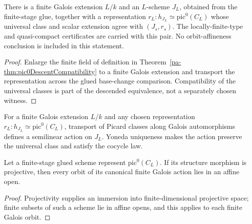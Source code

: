 \begin{theorem}
  \label{pa-thm:pic0FiniteGaloisStage}
  \notready
  There is a finite Galois extension \(L/k\) and an \(L\)-scheme \(J_L\), obtained from the
  finite-stage glue, together with a representation
  \(r_L:h_{J_L}\simeq\mathrm{pic}^0(C_L)\) whose universal class and scalar extension agree
  with \((J_s,r_s)\).  The locally-finite-type and quasi-compact certificates are carried with
  this pair.  No orbit-affineness conclusion is included in this statement.
\end{theorem}
\begin{proof}
  Enlarge the finite field of definition in
  Theorem~\ref{pa-thm:pic0DescentCompatibility} to a finite Galois extension and transport the
  representation across the glued base-change comparison.  Compatibility of the universal
  classes is part of the descended equivalence, not a separately chosen witness.
\end{proof}

\begin{definition}
  \label{pa-def:pic0FiniteGaloisAction}
  \leanok

  For a finite Galois extension \(L/k\) and any chosen representation
  \(r_L:h_{J_L}\simeq\mathrm{pic}^0(C_L)\), transport of Picard classes along Galois
  automorphisms defines a semilinear action on \(J_L\).  Yoneda uniqueness makes the action
  preserve the universal class and satisfy the cocycle law.
\end{definition}

\begin{theorem}
  \label{pa-thm:pic0FiniteStage_orbitsInAffine_of_projective}
  \leanok

  Let a finite-stage glued scheme represent \(\mathrm{pic}^0(C_L)\).  If its structure
  morphism is projective, then every orbit of its canonical finite Galois action lies in an
  affine open.
\end{theorem}
\begin{proof}
  \leanok
  Projectivity supplies an immersion into finite-dimensional projective space; finite subsets
  of such a scheme lie in affine opens, and this applies to each finite Galois orbit.
\end{proof}

